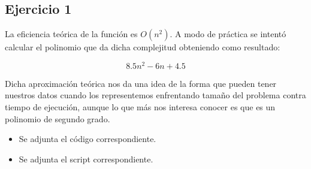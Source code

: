 \subsection*{Ejercicio 1}

\begin{flushleft}
  La eficiencia teórica de la función es $O(n^2)$. A modo de práctica
  se intentó calcular el polinomio que da dicha complejitud obteniendo como resultado:

  \[
    8.5n^2 -6n + 4.5
  \]

  Dicha aproximación teórica nos da una idea de la forma que pueden
  tener nuestros datos cuando los representemos enfrentando tamaño del
  problema contra tiempo de ejecución, aunque lo que más nos interesa
  conocer es que es un polinomio de segundo grado.
\end{flushleft}

\begin{itemize}
\item Se adjunta el código correspondiente.
\item Se adjunta el script correspondiente.
\end{itemize}

